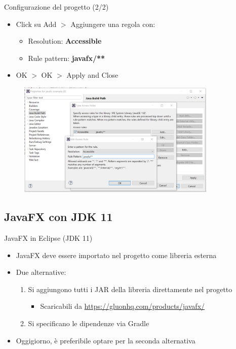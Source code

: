 \documentclass[presentation]{beamer}
\begin{document}
\begin{frame}{Configurazione del progetto (2/2)}
\begin{itemize}
\item Click su Add $>$ Aggiungere una regola con:
\begin{itemize}
\item Resolution: \textbf{Accessible}
\item Rule pattern: \textbf{javafx/**}
\end{itemize}
\item OK $>$ OK $>$ Apply and Close
\end{itemize}
\begin{figure}
\includegraphics[width=0.85\textwidth]{img/conf02.png}
\end{figure}
\end{frame}

\subsection{JavaFX con JDK 11}

\begin{frame}{JavaFX in Eclipse (JDK 11)}
\begin{itemize}\itemsep20pt
\item JavaFX deve essere importato nel progetto come libreria esterna
\item Due alternative:
\begin{enumerate}
\item Si aggiungono tutti i JAR della libreria direttamente nel progetto
\begin{itemize}
\item Scaricabili da \url{https://gluonhq.com/products/javafx/}
\end{itemize}
\item Si specificano le dipendenze via Gradle
\end{enumerate}
\item Oggigiorno, è preferibile optare per la seconda alternativa
\end{itemize}
\end{frame}
\end{document}
